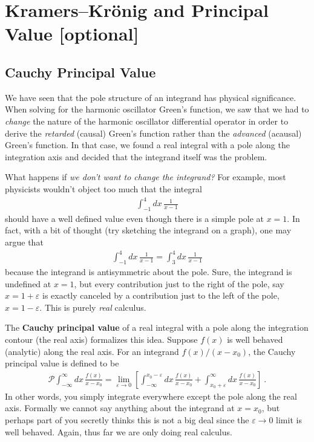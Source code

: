 
\section{Kramers--Kr\"onig and Principal Value [optional]}

\subsection{Cauchy Principal Value}

We have seen that the pole structure of an integrand has physical significance. When solving for the harmonic oscillator Green's function, we saw that we had to \emph{change} the nature of the harmonic oscillator differential operator in order to derive the \emph{retarded} (causal) Green's function rather than the \emph{advanced} (acausal) Green's function. In that case, we found a real integral with a pole along the integration axis and decided that the integrand itself was the problem.

What happens if \emph{we don't want to change the integrand?} For example, most physicists wouldn't object too much that the integral
\begin{align}
	\int_{-1}^4 dx\, \frac{1}{x-1}
\end{align}
should have a well defined value even though there is a simple pole at $x=1$. In fact, with a bit of thought (try sketching the integrand on a graph), one may argue that
\begin{align}
	\int_{-1}^4 dx\, \frac{1}{x-1}
	= 
	\int_{3}^4 dx\, \frac{1}{x-1}
\end{align}
because the integrand is antisymmetric about the pole. Sure, the integrand is undefined at $x=1$, but every contribution just to the right of the pole, say $x=1+\varepsilon$ is exactly canceled by a contribution just to the left of the pole, $x=1-\varepsilon$. This is purely \emph{real} calculus.

The \textbf{Cauchy principal value} of a real integral with a pole along the integration contour (the real axis) formalizes this idea. Suppose $f(x)$ is well behaved (analytic) along the real axis. For an integrand $f(x)/(x-x_0)$, the Cauchy principal value is defined to be
\begin{align}
	\mathcal P \int_{-\infty}^\infty dx\, \frac{f(x)}{x-x_0}
	= 
	\lim_{\varepsilon\to 0}
	\left[
	\int_{-\infty}^{x_0-\varepsilon} dx\, \frac{f(x)}{x-x_0}
	+\int_{x_0+\varepsilon}^\infty dx\, \frac{f(x)}{x-x_0}
	\right] \ .
\end{align}
In other words, you simply integrate everywhere except the pole along the real axis. Formally we cannot say anything about the integrand at $x=x_0$, but perhaps part of you secretly thinks this is not a big deal since the $\varepsilon\to 0$ limit is well behaved. Again, thus far we are only doing real calculus.

